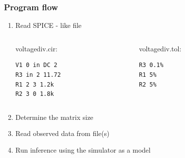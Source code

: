 \documentclass{beamer}
\begin{document}
  \begin{frame}[fragile]
    \frametitle{Program flow}
    \begin{enumerate}
      \item Read SPICE - like file
    \begin{center}

    \begin{columns}
      \begin{column}{0.33\textwidth}
        voltagediv.cir:

        \begin{verbatim}
V1 0 in DC 2 
R3 in 2 11.72
R1 2 3 1.2k
R2 3 0 1.8k
        \end{verbatim}
      \end{column}
      \begin{column}{0.33\textwidth}
        voltagediv.tol:
        \begin{verbatim}
R3 0.1%
R1 5%
R2 5%
        \end{verbatim}
      \end{column}
    \end{columns}
  \end{center}
  \item Determine the matrix size
  \item Read observed data from file(s)
  \item Run inference using the simulator as a model
  \end{enumerate}

  \end{frame}
  
\end{document}
